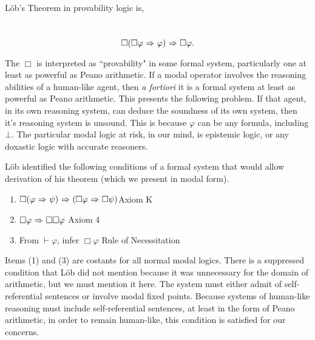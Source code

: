L\"ob's Theorem in provability logic is,
\begin{center}~\label{lob}
	\begin{equation}
	\Box(\Box\varphi {\ \Rightarrow \ } \varphi){\ \Rightarrow \ } \Box\varphi.
	\end{equation}
\end{center}
The $\Box$ is interpreted as ``provability" in some formal system, particularly one at least as powerful as Peano arithmetic. If a modal operator involves the reasoning abilities of a human-like agent, then \emph{a fortiori} it is a formal system at least as powerful as Peano arithmetic. This presents the following problem. If that agent, in its own reasoning system, can deduce the soundness of its own system, then it's reasoning system is unsound. This is because $\varphi$ can be any formula, including $\bot$. The particular modal logic at risk, in our mind, is epistemic logic, or any doxastic logic with accurate reasoners.

L\"ob identified the following conditions of a formal system that would allow derivation of his theorem (which we present in modal form).
\begin{enumerate}
	\item $\Box(\varphi {\ \Rightarrow \ } \psi) {\ \Rightarrow \ } (\Box\varphi {\ \Rightarrow \ } \Box \psi)$\mbox{}\hfill Axiom K
	\item $\Box\varphi {\ \Rightarrow \ } \Box\Box\varphi$ \mbox{}\hfill Axiom 4
	\item From $\vdash \varphi$, infer $\Box\varphi$ \mbox{}\hfill Rule of Necessitation
\end{enumerate}

Items (1) and (3) are costants for all normal modal logics. There is a suppressed condition that L\"ob did not mention because it was unnecessary for the domain of arithmetic, but we must mention it here. The system must either admit of self-referential sentences or involve modal fixed points. Because systems of human-like reasoning must include self-referential sentences, at least in the form of Peano arithmetic, in order to remain human-like, this condition is satisfied for our concerns. 

